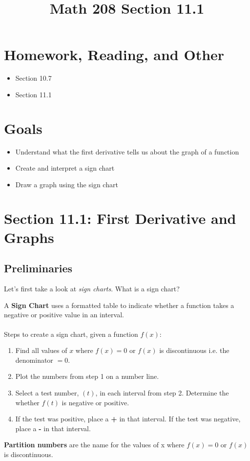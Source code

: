 \documentclass[14pt]{extarticle}
\title{\vspace{-5ex}Math 208 Section 11.1}
\date{\vspace{-10ex}}
\begin{document}
	\maketitle
	
\section{Homework, Reading, and Other}
\begin{itemize}
	\item Section 10.7
	\item Section 11.1
\end{itemize}

\section{Goals}
\begin{itemize}
	\item Understand what the first derivative tells us about the graph of a function
	\item Create and interpret a sign chart
	\item Draw a graph using the sign chart
\end{itemize}


\section{Section 11.1: First Derivative and Graphs}
\subsection{Preliminaries}
Let's first take a look at \textit{sign charts}. What is a sign chart?
\begin{tcolorbox}[enhanced jigsaw,colback=bg,boxrule=0pt,arc=0pt]
	A \textbf{Sign Chart} uses a formatted table to indicate whether a function takes a negative or positive value in an interval.
	\\\\
	Steps to create a sign chart, given a function $f(x)$:
	\begin{enumerate}
		\item Find all values of $x$ where $f(x)=0$ or $f(x)$ is discontinuous i.e. the denominator $=0$.
		\item Plot the numbers from step 1 on a number line.
		\item Select a test number, $(t)$, in each interval from step 2. Determine the whether $f(t)$ is negative or positive.
		\item If the test was positive, place a \textbf{+} in that interval. If the test was negative, place a \textbf{-} in that interval.
	\end{enumerate}
	\vspace{1em}
	\textbf{Partition numbers} are the name for the values of x where $f(x)=0$ or $f(x)$ is discontinuous.
\end{tcolorbox}
\end{document}
